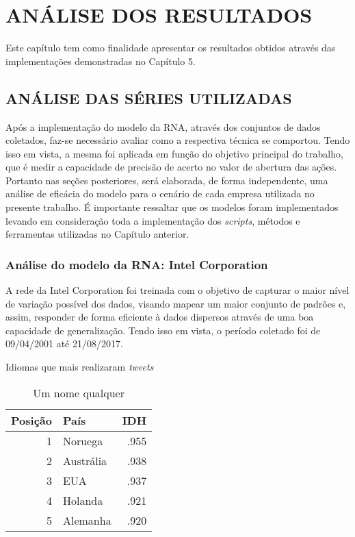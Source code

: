 
\chapter{ANÁLISE DOS RESULTADOS}\label{ch:resultados}
Este capítulo tem como finalidade apresentar os resultados obtidos através das implementações demonstradas no Capítulo 5.

\section{ANÁLISE DAS SÉRIES UTILIZADAS}
Após a implementação do modelo da RNA, através dos conjuntos de dados coletados, faz-se necessário avaliar como a respectiva técnica se comportou. Tendo isso em vista, a mesma foi aplicada em função do objetivo principal do trabalho, que é medir a capacidade de precisão de acerto no valor de abertura das ações. Portanto nas seções posteriores, será elaborada, de forma independente, uma análise de eficácia do modelo para o cenário de cada empresa utilizada no presente trabalho. É importante ressaltar que os modelos foram implementados levando em consideração toda a implementação dos \textit{scripts}, métodos e ferramentas utilizadas no Capítulo anterior.

\subsection{Análise do modelo da RNA: Intel Corporation}
A rede da Intel Corporation foi treinada com o objetivo de capturar o maior nível de variação possível dos dados, visando mapear um maior conjunto de padrões e, assim, responder de forma eficiente à dados dispersos através de uma boa capacidade de generalização. Tendo isso em vista, o período coletado foi de 09/04/2001 até 21/08/2017.


\begin{grafico}[h]
	\centering
	\caption{Idiomas que mais realizaram \textit{tweets}}
	\label{lingua}
\end{grafico}

\begin{table}[h]
\centering
\caption{Um nome qualquer}
\vspace{0.5cm}
\begin{tabular}{r|l|r}

Posição & País & IDH \\ %
\hline                               %
1 & Noruega        & .955 \\
2 & Austr{\'a}lia  & .938 \\
3 & EUA            & .937 \\
4 & Holanda        & .921 \\
5 & Alemanha       & .920            %

\end{tabular}
\end{table}









